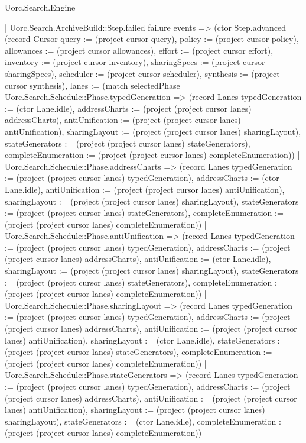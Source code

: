 \begin{lexlean}{Uorc.Search.Engine}
\begin{semanticmodule}
{      | Uorc.Search.ArchiveBuild::Step.failed failure events => (ctor Step.advanced (record Cursor {query := (project cursor query), policy := (project cursor policy), allowances := (project cursor allowances), effort := (project cursor effort), inventory := (project cursor inventory), sharingSpecs := (project cursor sharingSpecs), scheduler := (project cursor scheduler), synthesis := (project cursor synthesis), lanes := (match selectedPhase
        | Uorc.Search.Schedule::Phase.typedGeneration => (record Lanes {typedGeneration := (ctor Lane.idle), addressCharts := (project (project cursor lanes) addressCharts), antiUnification := (project (project cursor lanes) antiUnification), sharingLayout := (project (project cursor lanes) sharingLayout), stateGenerators := (project (project cursor lanes) stateGenerators), completeEnumeration := (project (project cursor lanes) completeEnumeration)})
        | Uorc.Search.Schedule::Phase.addressCharts => (record Lanes {typedGeneration := (project (project cursor lanes) typedGeneration), addressCharts := (ctor Lane.idle), antiUnification := (project (project cursor lanes) antiUnification), sharingLayout := (project (project cursor lanes) sharingLayout), stateGenerators := (project (project cursor lanes) stateGenerators), completeEnumeration := (project (project cursor lanes) completeEnumeration)})
        | Uorc.Search.Schedule::Phase.antiUnification => (record Lanes {typedGeneration := (project (project cursor lanes) typedGeneration), addressCharts := (project (project cursor lanes) addressCharts), antiUnification := (ctor Lane.idle), sharingLayout := (project (project cursor lanes) sharingLayout), stateGenerators := (project (project cursor lanes) stateGenerators), completeEnumeration := (project (project cursor lanes) completeEnumeration)})
        | Uorc.Search.Schedule::Phase.sharingLayout => (record Lanes {typedGeneration := (project (project cursor lanes) typedGeneration), addressCharts := (project (project cursor lanes) addressCharts), antiUnification := (project (project cursor lanes) antiUnification), sharingLayout := (ctor Lane.idle), stateGenerators := (project (project cursor lanes) stateGenerators), completeEnumeration := (project (project cursor lanes) completeEnumeration)})
        | Uorc.Search.Schedule::Phase.stateGenerators => (record Lanes {typedGeneration := (project (project cursor lanes) typedGeneration), addressCharts := (project (project cursor lanes) addressCharts), antiUnification := (project (project cursor lanes) antiUnification), sharingLayout := (project (project cursor lanes) sharingLayout), stateGenerators := (ctor Lane.idle), completeEnumeration := (project (project cursor lanes) completeEnumeration)})
}}
\end{semanticmodule}
\end{lexlean}
